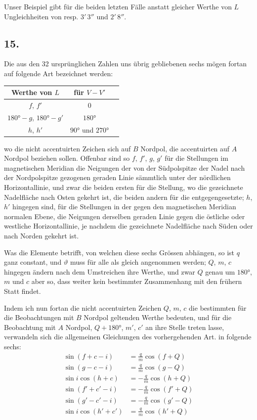 \documentclass[12pt,a4paper]{article}
\begin{document}
Unser Beispiel gibt für die beiden letzten Fälle anstatt gleicher Werthe von $L$ Ungleichheiten von resp. $3'\,3''$ und $2'\,8''$.

\subsection*{15.}
Die aus den 32 ursprünglichen Zahlen uns übrig gebliebenen sechs mögen fortan auf folgende Art bezeichnet werden:
\begin{center}
\begin{tabular}{c|c|c}
Werthe von $L$ & für $V - V'$ \\
\midrule
$f$, $f'$ & $0$ \\
$180° - g$, $180° - g'$ & $180°$ \\
$h$, $h'$ & $90°$ und $270°$
\end{tabular}
\end{center}
wo die nicht accentuirten Zeichen sich auf $B$ Nordpol, die accentuirten auf $A$ Nordpol beziehen sollen. Offenbar sind so $f$, $f'$, $g$, $g'$ für die Stellungen im magnetischen Meridian die Neigungen der von der Südpolspitze der Nadel nach der Nordpolspitze gezogenen geraden Linie sämmtlich unter der nördlichen Horizontallinie, und zwar die beiden ersten für die Stellung, wo die gezeichnete Nadelfläche nach Osten gekehrt ist, die beiden andern für die entgegengesetzte; $h$, $h'$ hingegen sind, für die Stellungen in der gegen den magnetischen Meridian normalen Ebene, die Neigungen derselben geraden Linie gegen die östliche oder westliche Horizontallinie, je nachdem die gezeichnete Nadelfläche nach Süden oder nach Norden gekehrt ist.

Was die Elemente betrifft, von welchen diese sechs Grössen abhängen, so ist $q$ ganz constant, und $\vartheta$ muss für alle als gleich angenommen werden; $Q$, $m$, $c$ hingegen ändern nach dem Umstreichen ihre Werthe, und zwar $Q$ genau um $180°$, $m$ und $c$ aber so, dass weiter kein bestimmter Zusammenhang mit den frühern Statt findet.

Indem ich nun fortan die nicht accentuirten Zeichen $Q$, $m$, $c$ die bestimmten für die Beobachtungen mit $B$ Nordpol geltenden Werthe bedeuten, und für die Beobachtung mit $A$ Nordpol, $Q + 180°$, $m'$, $c'$ an ihre Stelle treten lasse, verwandeln sich die allgemeinen Gleichungen des vorhergehenden Art. in folgende sechs:
\begin{align}
\sin(f + c - i) &= \frac{q}{m} \cos(f + Q) \tag{1} \\
\sin(g - c - i) &= \frac{q}{m} \cos(g - Q) \tag{2} \\
\sin i \cos(h + c) &= -\frac{q}{m} \cos(h + Q) \tag{3} \\
\sin(f' + c' - i) &= -\frac{q}{m} \cos(f' + Q) \tag{4} \\
\sin(g' - c' - i) &= -\frac{q}{m} \cos(g' - Q) \tag{5} \\
\sin i \cos(h' + c') &= \frac{q}{m} \cos(h' + Q) \tag{6}
\end{align}
\end{document}
